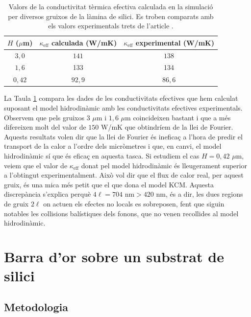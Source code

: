 \documentclass{article}
\begin{document}
\begin{table}[ht!]
\centering
\caption{Valors de la conductivitat t\`{e}rmica efectiva calculada en la simulaci\'{o} per diversos gruixos de la l\`{a}mina de silici. Es troben comparats amb els valors experimentals trets de l'article \cite{beardo2019hydrodynamic}.}
\label{Tab:keff}
\begin{tabular}{c|c|c}
$H$ ($\mu$m)&$\kappa_{\text{eff}}$ calculada (W/mK)&$\kappa_{\text{eff}}$ experimental (W/mK)\\\hline
$3,0$&$141$&$138$\\
$1,6$&133&134\\
$0,42$&$92,9$&$86,6$
\end{tabular}
\end{table}

La Taula \ref{Tab:keff} compara les dades de les conductivitats efectives que hem calculat suposant el model hidrodin\`{a}mic amb les conductivitats efectives experimentals. Observem que pels gruixos $3$ $\mu$m i $1,6$ $\mu$m coincideixen bastant i que a m\'{e}s difereixen molt del valor de $150$ W/mK que obtindr\'{i}em de la llei de Fourier. Aquests resultats volen dir que la llei de Fourier \'{e}s inefica\c{c} a l'hora de predir el transport de la calor a l'ordre dels micr\`{o}metres i que, en canvi, el model hidrodin\`{a}mic s\'{i} que \'{e}s efica\c{c} en aquesta tasca. Si estudiem el cas $H=0,42$ $\mu$m, veiem que el valor de $\kappa_{\text{eff}}$ donat pel model hidrodin\`{a}mic \'{e}s lleugerament superior a l'obtingut experimentalment. Aix\`{o} vol dir que el flux de calor real, per aquest gruix, \'{e}s una mica m\'{e}s petit que el que dona el model KCM. Aquesta discrep\`{a}ncia s'explica perqu\`{e} $4\ell=704\text{ nm}>420\text{ nm}$, \'{e}s a dir, les dues regions de gruix $2\ell$ on actuen els efectes no locals es sobreposen, fent que siguin notables les col\textperiodcentered lisions bal\'{i}stiques dels fonons, que no venen recollides al model hidrodin\`{a}mic.

\section{Barra d'or sobre un substrat de silici}

\subsection{Metodologia}
\end{document}
